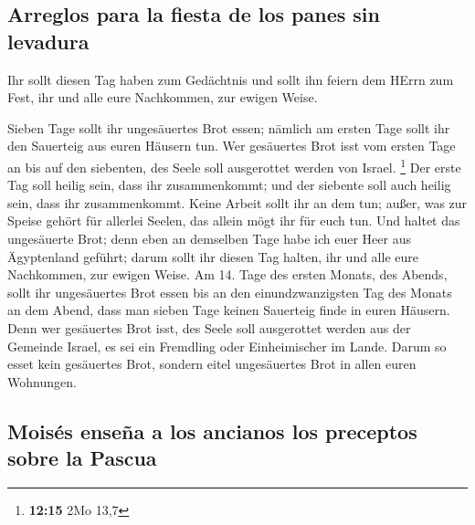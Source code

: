 \hypertarget{arreglos-para-la-fiesta-de-los-panes-sin-levadura}{%
\subsection{Arreglos para la fiesta de los panes sin
levadura}\label{arreglos-para-la-fiesta-de-los-panes-sin-levadura}}

 Ihr sollt diesen Tag haben zum Gedächtnis und sollt ihn
feiern dem HErrn zum Fest, ihr und alle eure Nachkommen, zur ewigen
Weise.

 Sieben Tage sollt ihr ungesäuertes Brot essen; nämlich
am ersten Tage sollt ihr den Sauerteig aus euren Häusern tun. Wer
gesäuertes Brot isst vom ersten Tage an bis auf den siebenten, des Seele
soll ausgerottet werden von Israel. \footnote{\textbf{12:15} 2Mo 13,7}
 Der erste Tag soll heilig sein, dass ihr zusammenkommt;
und der siebente soll auch heilig sein, dass ihr zusammenkommt. Keine
Arbeit sollt ihr an dem tun; außer, was zur Speise gehört für allerlei
Seelen, das allein mögt ihr für euch tun.  Und haltet das
ungesäuerte Brot; denn eben an demselben Tage habe ich euer Heer aus
Ägyptenland geführt; darum sollt ihr diesen Tag halten, ihr und alle
eure Nachkommen, zur ewigen Weise.  Am 14. Tage des
ersten Monats, des Abends, sollt ihr ungesäuertes Brot essen bis an den
einundzwanzigsten Tag des Monats an dem Abend,  dass man
sieben Tage keinen Sauerteig finde in euren Häusern. Denn wer gesäuertes
Brot isst, des Seele soll ausgerottet werden aus der Gemeinde Israel, es
sei ein Fremdling oder Einheimischer im Lande.  Darum so
esset kein gesäuertes Brot, sondern eitel ungesäuertes Brot in allen
euren Wohnungen.

\hypertarget{moisuxe9s-enseuxf1a-a-los-ancianos-los-preceptos-sobre-la-pascua}{%
\subsection{Moisés enseña a los ancianos los preceptos sobre la
Pascua}\label{moisuxe9s-enseuxf1a-a-los-ancianos-los-preceptos-sobre-la-pascua}}

